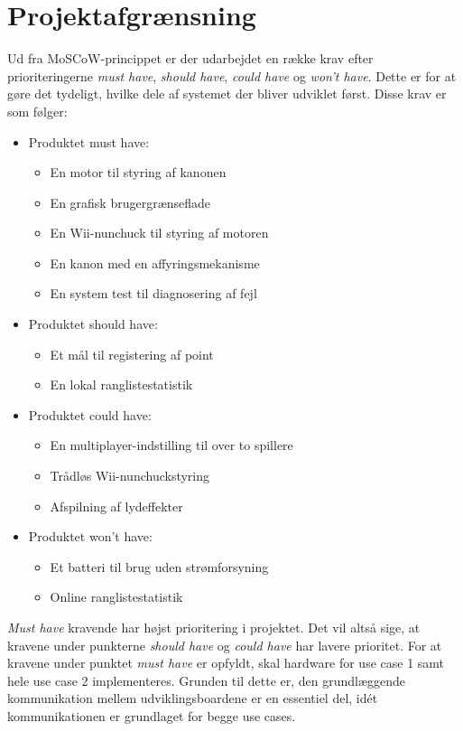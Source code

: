 \chapter{Projektafgrænsning}
\label{afsnit:Projektafgraensning}

Ud fra MoSCoW-princippet er der udarbejdet en række krav efter prioriteringerne \textit{must have}, \textit{should have}, \textit{could have} og \textit{won’t have}. Dette er for at gøre det tydeligt, hvilke dele af systemet der bliver udviklet først. Disse krav er som følger:
\begin{itemize}
	\item Produktet must have:
	\begin{itemize}
		\item En motor til styring af kanonen
		\item En grafisk brugergrænseflade
		\item En Wii-nunchuck til styring af motoren
		\item En kanon med en affyringsmekanisme
		\item En system test til diagnosering af fejl
	\end{itemize}
	\item Produktet should have:
	\begin{itemize}
		\item Et mål til registering af point
		\item En lokal ranglistestatistik
	\end{itemize}
	\item Produktet could have:
	\begin{itemize}
		\item En multiplayer-indstilling til over to spillere
		\item Trådløs Wii-nunchuckstyring
		\item Afspilning af lydeffekter
	\end{itemize}
	\item Produktet won’t have:
	\begin{itemize}
		\item Et batteri til brug uden strømforsyning
		\item Online ranglistestatistik
	\end{itemize}
\end{itemize}

\noindent \textit{Must have} kravende har højst prioritering i projektet. Det vil altså sige, at kravene under punkterne \textit{should have} og \textit{could have} har lavere prioritet. For at kravene under punktet \textit{must have} er opfyldt, skal hardware for use case 1 samt hele use case 2 implementeres. Grunden til dette er, den grundlæggende kommunikation mellem udviklingsboardene er en essentiel del, idét kommunikationen er grundlaget for begge use cases.





